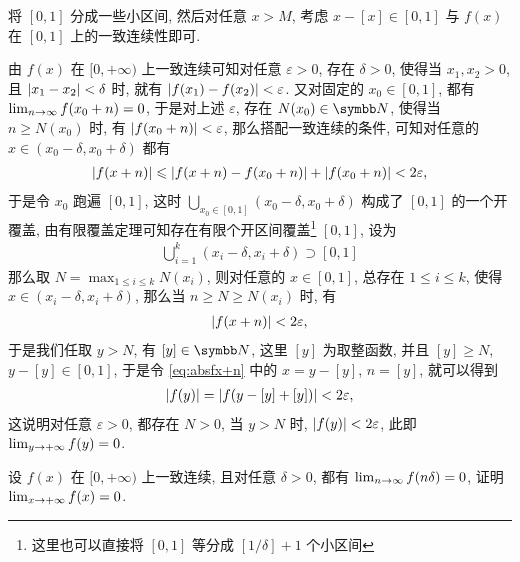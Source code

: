 \begin{exercise}[series=exer]
  \begin{hint}
      将 $ [0, 1] $ 分成一些小区间, 然后对任意 $ x > M $, 考虑 $ x - [x] \in [0, 1] $ 与 $ f(x) $ 在 $ [0, 1] $ 上的一致连续性即可.
  \end{hint}
  \begin{answer}
      由 $ f(x) $ 在 $ [0, +\infty) $ 上一致连续可知对任意 $ \varepsilon > 0 $, 存在 $ \delta > 0 $, 使得当 $ x_{1}, x_{2} > 0 $, 且 $ \abs{x_{1} - x_{2}} < \delta $ 时, 就有 $ \abs{f(x_{1}) - f(x_{2})} < \varepsilon $. 又对固定的 $ x_{0} \in [0, 1] $, 都有 $ \lim_{n \to \infty} f(x_{0} + n) = 0 $, 于是对上述 $ \varepsilon $, 存在 $ N(x_{0}) \in \N $, 使得当 $ n \ge N(x_{0}) $ 时, 有 $ \abs{f(x_{0} + n)} < \varepsilon $, 那么搭配一致连续的条件, 可知对任意的 $ x \in (x_{0} - \delta, x_{0} + \delta) $ 都有
      \begin{align*}
          \abs{f(x + n)} \leqslant \abs{f(x + n) - f(x_{0} + n)} + \abs{f(x_{0} + n)} < 2 \varepsilon,
      \end{align*}
      于是令 $ x_{0} $ 跑遍 $ [0, 1] $, 这时 $ \bigcup_{x_{0} \in [0, 1]} (x_{0} - \delta, x_{0} + \delta) $ 构成了 $ [0, 1] $ 的一个开覆盖, 由有限覆盖定理可知存在有限个开区间覆盖\footnote{这里也可以直接将 $ [0, 1] $ 等分成 $ [1/\delta] + 1 $ 个小区间} $ [0, 1] $, 设为
      \begin{align*}
          \bigcup_{i = 1}^{k} (x_{i} - \delta, x_{i} + \delta) \supset [0, 1]
      \end{align*}
      那么取 $ N = \max_{1 \le i \le k} N(x_{i}) $, 则对任意的 $ x \in [0, 1] $, 总存在 $ 1 \le i \le k $, 使得 $ x \in (x_{i} - \delta, x_{i} + \delta) $, 那么当 $ n \ge N \ge N(x_{i}) $ 时, 有
      \begin{align}\label{eq:absfx+n}
          \abs{f(x + n)} < 2\varepsilon,
      \end{align}
      于是我们任取 $ y > N $, 有 $ [y] \in \N $, 这里 $ [y] $ 为取整函数, 并且 $ [y] \ge N $, $ y - [y] \in [0, 1] $, 于是令 \eqref{eq:absfx+n} 中的 $ x = y - [y] $, $ n = [y] $, 就可以得到
      \begin{align*}
          \abs{f(y)} = \abs{f(y - [y] + [y])} < 2\varepsilon,
      \end{align*}
      这说明对任意 $ \varepsilon > 0 $, 都存在 $ N > 0 $, 当 $ y > N $ 时, $ \abs{f(y)} < 2\varepsilon $, 此即 $ \lim_{y \to +\infty}f(y) = 0 $.
  \end{answer}
  \item 设 $ f(x) $ 在 $ [0, +\infty) $ 上一致连续, 且对任意 $ \delta > 0 $, 都有 $ \lim_{n \to \infty} f(n\delta) = 0 $, 证明 $ \lim_{x \to +\infty} f(x) = 0 $.

\end{exercise}
